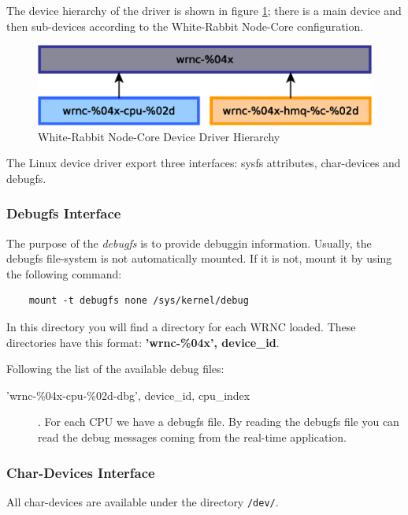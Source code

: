 \documentclass[a4paper,10pt]{article}
\begin{document}
The device hierarchy of the driver is shown in figure 
\ref{fig:swdrvhier}; there is a main device and then sub-devices 
according to the White-Rabbit Node-Core configuration.

\begin{figure}[ht]
	\centering
	\includegraphics[scale=0.5]{img/sw-drv-hier.eps}
	\caption{White-Rabbit Node-Core Device Driver Hierarchy}
        \label{fig:swdrvhier}
\end{figure}

The Linux device driver export three interfaces: sysfs attributes,
char-devices and debugfs.

\subsubsection{Debugfs Interface}
The purpose of the \textit{debugfs} is to provide debuggin information.
Usually, the debugfs file-system is not automatically mounted. If it
is not, mount it by using the following command:

\begin{verbatim}
    mount -t debugfs none /sys/kernel/debug
\end{verbatim}

In this directory you will find a directory for each WRNC loaded. These
directories have this format: \textbf{'wrnc-\%04x', device\_id}.

Following the list of the available debug files:
\begin{description}
  \item['wrnc-\%04x-cpu-\%02d-dbg', device\_id, cpu\_index]. For each
CPU we have a debugfs file. By reading the debugfs file you can
read the debug messages coming from the real-time application.
\end{description}

\subsubsection{Char-Devices Interface}
All char-devices are available under the directory \texttt{/dev/}.
\end{document}
